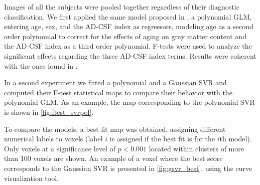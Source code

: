 \documentclass{article}
\begin{document}
Images of all the subjects were pooled together regardless of their diagnostic classification. We first applied the same model proposed in \cite{Nonlinear_Gispert_2015}, a polynomial GLM, entering age, sex, and the AD-CSF index as regressors, modeling age as a second order polynomial to correct for the effects of aging on gray matter content and the AD-CSF index as a third order polynomial. F-tests were used to analyze the significant effects regarding the three AD-CSF index terms. Results were coherent with the ones found in \cite{Nonlinear_Gispert_2015}.

In a second experiment we fitted a polynomial and a Gaussian SVR and computed their F-test statistical maps to compare their behavior with the polynomial GLM. As an example, the map corresponding to the polynomial SVR is shown in \autoref{fig:ftest_svrpol}.

To compare the models, a best-fit map was obtained, assigning different numerical labels to voxels (label $i$ is assigned if the best fit is for the $i$th model).  Only voxels at a significance level of  $p<0.001$ located within clusters of more than 100 voxels are shown. An example of a voxel where the best score corresponds to the Gaussian SVR is presented in \autoref{fig:gsvr_best}, using the curve visualization tool.
\end{document}
